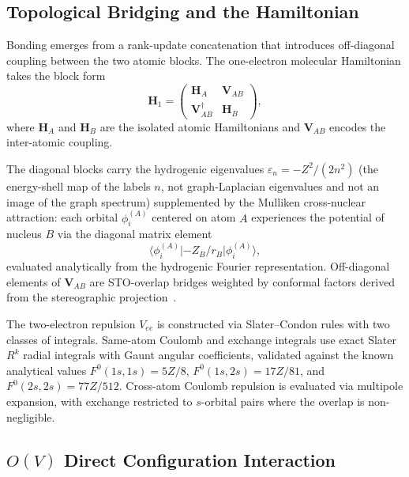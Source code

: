 \documentclass[aps,pra,twocolumn,superscriptaddress,longbibliography]{revtex4-2}
\begin{document}
\subsection{Topological Bridging and the Hamiltonian}
\label{sec:bridging}

Bonding emerges from a rank-update concatenation that introduces
off-diagonal coupling between the two atomic blocks.  The one-electron
molecular Hamiltonian takes the block form
\begin{equation}
\mathbf{H}_1 =
\begin{pmatrix}
\mathbf{H}_A & \mathbf{V}_{AB} \\
\mathbf{V}_{AB}^{\dagger} & \mathbf{H}_B
\end{pmatrix},
\label{eq:block_h1}
\end{equation}
where $\mathbf{H}_A$ and $\mathbf{H}_B$ are the isolated atomic
Hamiltonians and $\mathbf{V}_{AB}$ encodes the inter-atomic coupling.

The diagonal blocks carry the hydrogenic eigenvalues
$\varepsilon_n = -Z^2/(2n^2)$ (the energy-shell map of the labels $n$,
not graph-Laplacian eigenvalues and not an image of the graph spectrum) supplemented
by the Mulliken
cross-nuclear attraction: each orbital $\phi_i^{(A)}$ centered on atom
$A$ experiences the potential of nucleus $B$ via the diagonal matrix
element
\begin{equation}
\langle \phi_i^{(A)} | {-Z_B}/{r_B} | \phi_i^{(A)} \rangle,
\label{eq:mulliken}
\end{equation}
evaluated analytically from the hydrogenic Fourier representation.
Off-diagonal elements of $\mathbf{V}_{AB}$ are STO-overlap bridges
weighted by conformal factors derived from the stereographic
projection~\cite{fock1935}.

The two-electron repulsion $V_{ee}$ is constructed via Slater--Condon
rules with two classes of integrals.  Same-atom Coulomb and exchange
integrals use exact Slater $R^k$ radial integrals with Gaunt angular
coefficients, validated against the known analytical values
$F^0(1s,1s)=5Z/8$, $F^0(1s,2s)=17Z/81$, and
$F^0(2s,2s)=77Z/512$.  Cross-atom Coulomb repulsion
is evaluated via multipole expansion, with exchange restricted to
$s$-orbital pairs where the overlap is non-negligible.

\subsection{\texorpdfstring{$O(V)$}{O(V)} Direct Configuration Interaction}
\label{sec:direct_ci}
\end{document}
